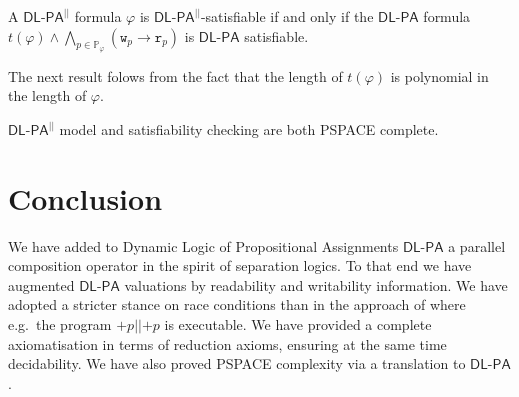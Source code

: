 \documentclass{llncs}
\newcommand{\pll}{ {||} }							%
\newcommand{\readOf}[1]{\mathbb{R}_{#1}}
\newcommand{\readable}[1]{\mathtt{r}_{#1}}
\newcommand{\readset}{\mathsf{Rd}}
\newcommand{\valuset}{\mathsf{V}}
\newcommand{\writable}[1]{\mathtt{w}_{#1}}
\newcommand{\writeset}{\mathsf{Wr}}
\newcommand{\writeOf}[1]{\mathbb{W}_{#1}}
\newcommand{\Dlpa}{\ensuremath{\mathsf{DL\text{-}PA}}\xspace}
\newcommand{\DlpaPll}{\ensuremath{\mathsf{DL\text{-}PA}^\pll}\xspace}
\newcommand{\assgntop}[1]{{\mathtt {+} #1}}
\newcommand{\intPgm}[1]{\llbracket #1 \rrbracket}
\newcommand{\limp}{ \rightarrow }
\renewcommand{\phi}{\varphi}
\newcommand{\propset}{\mathbb P}
\newcommand{\propsetOf}[1]{\propset_{#1}}
\newcommand{\tuple}[1]{ \langle #1 \rangle}
\begin{document}
\begin{theorem}
A \DlpaPll formula $\phi$ is \DlpaPll-satisfiable if and only if the \Dlpa formula
$t(\phi) \land \bigwedge_{p \in \propsetOf \phi } (\writable{p} \limp \readable p)$ 
is \Dlpa satisfiable.
\end{theorem}

The next result folows from the fact that the length of $t(\phi)$ is polynomial in the length of $\phi$. 

\begin{theorem}
\DlpaPll model and satisfiability checking are both PSPACE complete.
\end{theorem}


\section{Conclusion}\label{sec:conclusion}

We have added to Dynamic Logic of Propositional Assignments \Dlpa
a parallel composition operator in the spirit of separation logics. 
To that end we have augmented \Dlpa valuations by readability and writability information. 
We have adopted a stricter stance on race conditions than in the approach of \cite{HerzigEtal-Ijcai19} 
where e.g.\ the program $\assgntop p \pll \assgntop p$ is executable.
We have provided a complete axiomatisation in terms of reduction axioms, 
ensuring at the same time decidability. 
We have also proved PSPACE complexity via a translation to \Dlpa. 
\end{document}
